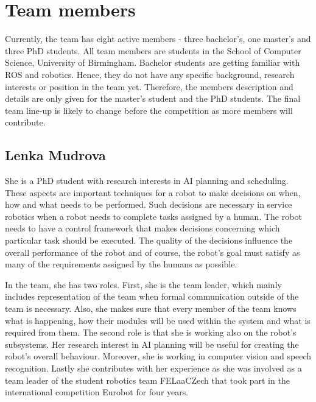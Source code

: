 
\section{Team members}
Currently, the team has eight active members - three bachelor's, one master's and three PhD students. All team members are students in the School of Computer Science, University of Birmingham. Bachelor students are getting familiar with ROS and robotics. Hence, they do not have any specific background, research interests or position in the team yet. Therefore, the members description and details are only given for the master's student and the PhD students. The final team line-up is likely to change before the competition as more members will contribute.

\subsection{Lenka Mudrova}

She is a PhD student with research interests in AI planning and scheduling. These aspects are important techniques for a robot to make decisions on when, how and what needs to be performed. Such decisions are necessary in service robotics when a robot needs to complete tasks assigned by a human. The robot needs to have a control framework that makes decisions concerning which particular task should be executed. The quality of the decisions influence the overall performance of the robot and of course, the robot's goal must satisfy as many of the requirements assigned by the humans as possible.

In the team, she has two roles. First, she is the team leader, which mainly includes representation of the team when formal communication outside of the team is necessary. Also, she makes sure that every member of the team knows what is happening, how their modules will be used within the system and what is required from them. The second role is that she is working also on the robot's subsystems. Her research interest in AI planning will be useful for creating the robot's overall behaviour. Moreover, she is working in computer vision and speech recognition. Lastly she contributes with her experience as she was involved as a team leader of the student robotics team FELaaCZech that took part in the international competition Eurobot for four years. 


